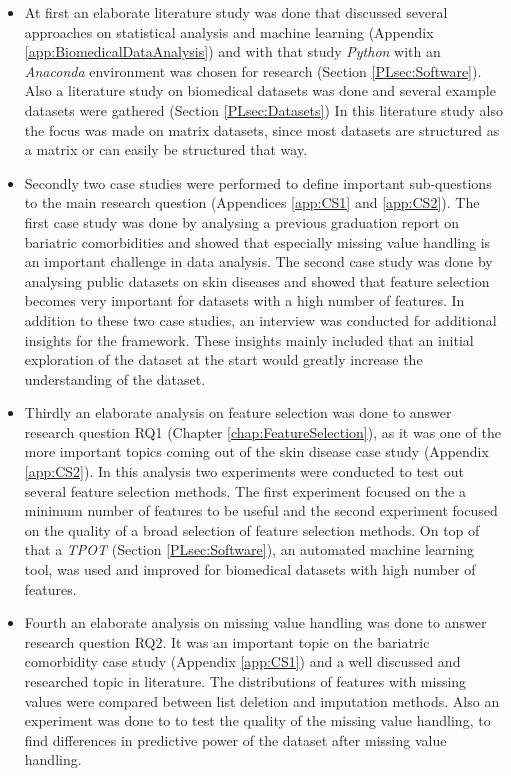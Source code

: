 \documentclass[10pt,a4paper]{report}
\begin{document}
	\begin{itemize}
		\item At first an elaborate literature study was done that discussed several approaches on statistical analysis and machine learning (Appendix \ref{app:BiomedicalDataAnalysis}) and with that study \textit{Python} with an \textit{Anaconda} environment was chosen for research (Section \ref{PLsec:Software}). Also a literature study on biomedical datasets was done and several example datasets were gathered (Section \ref{PLsec:Datasets}) In this literature study also the focus was made on matrix datasets, since most datasets are structured as a matrix or can easily be structured that way.
		
		\item Secondly two case studies were performed to define important sub-questions to the main research question (Appendices \ref{app:CS1} and \ref{app:CS2}). The first case study was done by analysing a previous graduation report on bariatric comorbidities\cite{Deneer2017Thesis} and showed that especially missing value handling is an important challenge in data analysis. The second case study was done by analysing public datasets on skin diseases\cite{nair2009genome, suarez2012expanding, bigler2013cross, kim2016spectrum, yao2008type, suarez2011nonlesional, tintle2011reversal, gittler2012progressive} and showed that feature selection becomes very important for datasets with a high number of features. In addition to these two case studies, an interview was conducted for additional insights for the framework. These insights mainly included that an initial exploration of the dataset at the start would greatly increase the understanding of the dataset.
		
		\item Thirdly an elaborate analysis on feature selection was done to answer research question RQ1 (Chapter \ref{chap:FeatureSelection}), as it was one of the more important topics coming out of the skin disease case study (Appendix \ref{app:CS2}). In this analysis two experiments were conducted to test out several feature selection methods. The first experiment focused on the a minimum number of features to be useful and the second experiment focused on the quality of a broad selection of feature selection methods. On top of that a \textit{TPOT} (Section \ref{PLsec:Software}), an automated machine learning tool, was used and improved for biomedical datasets with high number of features.
		
		\item Fourth an elaborate analysis on missing value handling was done to answer research question RQ2. It was an important topic on the bariatric comorbidity case study (Appendix \ref{app:CS1}) and a well discussed and researched topic in literature\cite{CIOS20021, Yoo2012}. The distributions of features with missing values were compared between list deletion and imputation methods. Also an experiment was done to to test the quality of the missing value handling, to find differences in predictive power of the dataset after missing value handling.
		

\end{itemize}
\end{document}
